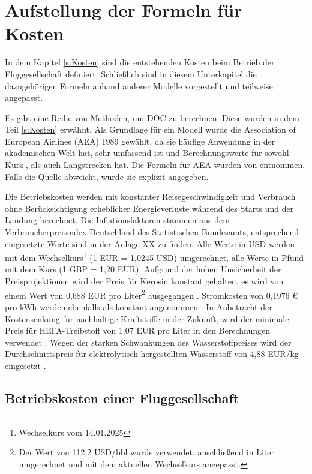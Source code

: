 \section{Aufstellung der Formeln für Kosten}
\label{s:Aufstellung der Formeln für Kosten}

In dem Kapitel \ref{s:Kosten} sind die entstehenden Kosten beim Betrieb der Fluggesellschaft definiert.
Schließlich sind in diesem Unterkapitel die dazugehörigen Formeln anhand anderer Modelle vorgestellt und teilweise angepasst. 

Es gibt eine Reihe von Methoden, um DOC zu berechnen. 
Diese wurden in dem Teil \ref{s:Kosten} erwähnt.
Als Grundlage für ein Modell wurde die Association of European Airlines (AEA) 1989 gewählt, 
da sie häufige Anwendung in der akademischen Welt hat, 
sehr umfassend ist und Berechnungswerte für sowohl Kurz-, als auch Langstrecken hat. 
Die Formeln für AEA wurden von \cite{minwoo2019analysis} entnommen.
Falls die Quelle abweicht, wurde sie explizit angegeben. %

Die Betriebskosten werden mit konstanter Reisegeschwindigkeit und Verbrauch ohne 
Berücksichtigung erheblicher Energieverluste während des Starts und der Landung berechnet. 
Die Inflationsfaktoren stammen aus dem Verbraucherpreisindex Deutschland des Statistischen Bundesamts, 
entsprechend eingesetzte Werte sind in der Anlage XX zu finden. %
Alle Werte in USD werden mit dem Wechselkurs\footnote{Wechselkurs vom 14.01.2025} (1 EUR = 1,0245 USD)
umgerechnet, alle Werte in Pfund mit dem Kurs (1 GBP = 1,20 EUR).
Aufgrund der hohen Unsicherheit der Preisprojektionen wird der Preis für Kerosin 
konstant gehalten, es wird von einem Wert von 0,688 EUR pro Liter\footnote{Der Wert von 112,2 USD/bbl 
wurde verwendet, anschließend in Liter umgerechnet und mit dem aktuellen Wechselkurs angepasst.} 
ausgegangen \cite{iata_industry_statistics_2024}. 
Stromkosten von 0,1976 € pro kWh werden ebenfalls als konstant angenommen \cite{eurostat_nrg_pc_205}.
In Anbetracht der Kostensenkung für nachhaltige Kraftstoffe in der Zukunft, 
wird der minimale Preis für HEFA-Treibstoff von 1,07 EUR pro Liter in den Berechnungen verwendet \cite{watson2024sustainable}.
Wegen der starken Schwankungen des Wasserstoffpreises wird der Durchschnittspreis für 
elektrolytisch hergestellten Wasserstoff von 4,88 EUR/kg eingesetzt \cite{hoelzen2022hydrogen}.
%
%
\subsection{Betriebskosten einer Fluggesellschaft}

